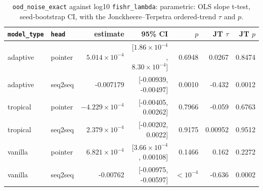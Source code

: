 \documentclass[10pt]{article}
\begin{document}
{\small
\begin{longtable}{llrrrrr}
\caption{\texttt{ood\_noise\_exact} against log10 \texttt{fishr\_lambda}: parametric: OLS slope t-test, seed-bootstrap CI, with the Jonckheere--Terpstra ordered-trend $\tau$ and $p$.}\label{tab:trend-ood_noise_exact}\\
\toprule
\texttt{model\_type} & \texttt{head} & estimate & 95\% CI & $p$ & JT $\tau$ & JT $p$\\
\midrule
\endhead
adaptive & pointer & $5.014\times10^{-4}$ & [$1.86\times10^{-4}$, $8.30\times10^{-4}$] & 0.6948 & 0.0267 & 0.8474\\
adaptive & seq2seq & -0.007179 & [-0.00939, -0.00497] & 0.0010 & -0.432 & 0.0012\\
tropical & pointer & $-4.229\times10^{-4}$ & [-0.00405, 0.00262] & 0.7966 & -0.059 & 0.6763\\
tropical & seq2seq & $2.379\times10^{-4}$ & [-0.00202, 0.0022] & 0.9175 & 0.00952 & 0.9512\\
vanilla & pointer & $6.821\times10^{-4}$ & [$3.66\times10^{-4}$, 0.00108] & 0.1466 & 0.162 & 0.2272\\
vanilla & seq2seq & -0.00762 & [-0.00975, -0.00597] & $<10^{-4}$ & -0.636 & 0.0002\\
\bottomrule
\end{longtable}
}
\end{document}
